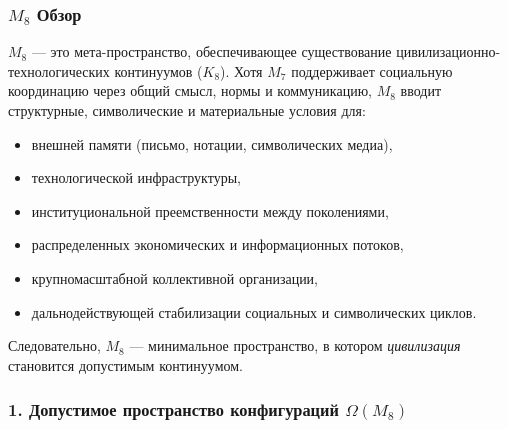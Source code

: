 

\subsubsection{\texorpdfstring{$M_8$}{M_8} Обзор}
\label{sec:m8-overview}

$M_8$ — это мета-пространство, обеспечивающее существование
цивилизационно-технологических континуумов ($K_8$).
Хотя $M_7$ поддерживает социальную координацию через общий смысл, нормы и
коммуникацию, $M_8$ вводит структурные, символические и материальные
условия для:

\begin{itemize}
    \item внешней памяти (письмо, нотации, символических медиа),
    \item технологической инфраструктуры,
    \item институциональной преемственности между поколениями,
    \item распределенных экономических и информационных потоков,
    \item крупномасштабной коллективной организации,
    \item дальнодействующей стабилизации социальных и символических циклов.
\end{itemize}

Следовательно, $M_8$ — минимальное пространство, в котором
\emph{цивилизация} становится допустимым континуумом.

\subsubsection*{1. Допустимое пространство конфигураций \texorpdfstring{$\Omega(M_8)$}{\Omega(M_8)}}

